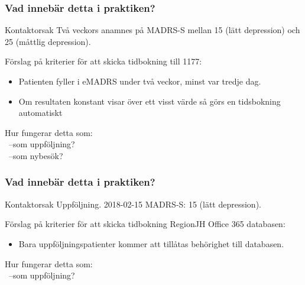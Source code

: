 \documentclass[english]{beamer}
\begin{document}
\begin{frame}
\frametitle{Vad innebär detta i praktiken?}
	\begin{block}{Kontaktorsak} 
	\scriptsize{
	 Två veckors anamnes på MADRS-S mellan 15 (lätt depression) och 25 (måttlig depression).\\
	}
	\end{block}
	Förslag på kriterier för att skicka tidbokning till 1177:
	\begin{itemize}
		\item Patienten fyller i eMADRS under två veckor, minst var tredje dag.
		\item Om resultaten konstant visar över ett visst värde så görs en tidsbokning automatiskt
	\end{itemize}
	\textcolor{lila}{Hur fungerar detta som:}\\
	\textcolor{lila}{\ --som uppföljning?}\\
	\textcolor{lila}{\ --som nybesök?}
\end{frame}

\begin{frame}
\frametitle{Vad innebär detta i praktiken?}
	\begin{block}{Kontaktorsak} 
	\scriptsize{
	 Uppföljning. 2018-02-15 MADRS-S: 15 (lätt depression).\\
	}
	\end{block}
	Förslag på kriterier för att skicka tidbokning RegionJH Office 365 databasen:
	\begin{itemize}
		\item Bara uppföljningspatienter kommer att tillåtas behörighet till databasen.
	\end{itemize}
	\textcolor{lila}{Hur fungerar detta som:}\\
	\textcolor{lila}{\ --som uppföljning?}\\
\end{frame}
\end{document}
